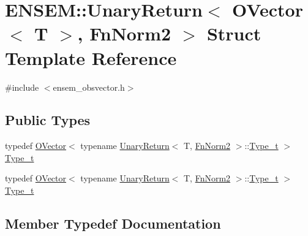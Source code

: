 \hypertarget{structENSEM_1_1UnaryReturn_3_01OVector_3_01T_01_4_00_01FnNorm2_01_4}{}\section{E\+N\+S\+EM\+:\+:Unary\+Return$<$ O\+Vector$<$ T $>$, Fn\+Norm2 $>$ Struct Template Reference}
\label{structENSEM_1_1UnaryReturn_3_01OVector_3_01T_01_4_00_01FnNorm2_01_4}


{\ttfamily \#include $<$ensem\+\_\+obsvector.\+h$>$}

\subsection*{Public Types}
\begin{DoxyCompactItemize}
\item 
typedef \mbox{\hyperlink{classENSEM_1_1OVector}{O\+Vector}}$<$ typename \mbox{\hyperlink{structENSEM_1_1UnaryReturn}{Unary\+Return}}$<$ T, \mbox{\hyperlink{structENSEM_1_1FnNorm2}{Fn\+Norm2}} $>$\+::\mbox{\hyperlink{structENSEM_1_1UnaryReturn_3_01OVector_3_01T_01_4_00_01FnNorm2_01_4_a67bb1e2e118524484dc34c80b8d75046}{Type\+\_\+t}} $>$ \mbox{\hyperlink{structENSEM_1_1UnaryReturn_3_01OVector_3_01T_01_4_00_01FnNorm2_01_4_a67bb1e2e118524484dc34c80b8d75046}{Type\+\_\+t}}
\item 
typedef \mbox{\hyperlink{classENSEM_1_1OVector}{O\+Vector}}$<$ typename \mbox{\hyperlink{structENSEM_1_1UnaryReturn}{Unary\+Return}}$<$ T, \mbox{\hyperlink{structENSEM_1_1FnNorm2}{Fn\+Norm2}} $>$\+::\mbox{\hyperlink{structENSEM_1_1UnaryReturn_3_01OVector_3_01T_01_4_00_01FnNorm2_01_4_a67bb1e2e118524484dc34c80b8d75046}{Type\+\_\+t}} $>$ \mbox{\hyperlink{structENSEM_1_1UnaryReturn_3_01OVector_3_01T_01_4_00_01FnNorm2_01_4_a67bb1e2e118524484dc34c80b8d75046}{Type\+\_\+t}}
\end{DoxyCompactItemize}


\subsection{Member Typedef Documentation}
\mbox{\label{structENSEM_1_1UnaryReturn_3_01OVector_3_01T_01_4_00_01FnNorm2_01_4_a67bb1e2e118524484dc34c80b8d75046}} 

